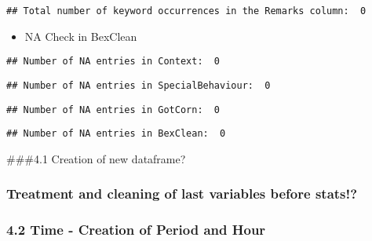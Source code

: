\documentclass[
]{article}
\providecommand{\tightlist}{%
  \setlength{\itemsep}{0pt}\setlength{\parskip}{0pt}}
\begin{document}
\begin{verbatim}
## Total number of keyword occurrences in the Remarks column:  0
\end{verbatim}

\begin{itemize}
\tightlist
\item
  NA Check in BexClean
\end{itemize}

\begin{verbatim}
## Number of NA entries in Context:  0
\end{verbatim}

\begin{verbatim}
## Number of NA entries in SpecialBehaviour:  0
\end{verbatim}

\begin{verbatim}
## Number of NA entries in GotCorn:  0
\end{verbatim}

\begin{verbatim}
## Number of NA entries in BexClean:  0
\end{verbatim}

\#\#\#4.1 Creation of new dataframe?

\hypertarget{treatment-and-cleaning-of-last-variables-before-stats}{%
\subsubsection{Treatment and cleaning of last variables before
stats!?}\label{treatment-and-cleaning-of-last-variables-before-stats}}

\hypertarget{time---creation-of-period-and-hour}{%
\subsubsection{4.2 Time - Creation of Period and
Hour}\label{time---creation-of-period-and-hour}}
\end{document}

